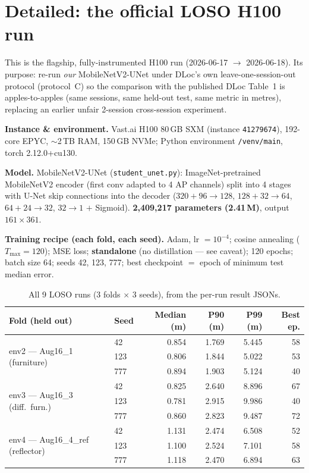 \documentclass[11pt]{article}
\newcommand{\file}[1]{\texttt{#1}}
\begin{document}
\section{Detailed: the official LOSO H100 run}
\label{sec:loso}
This is the flagship, fully-instrumented H100 run (2026-06-17 $\rightarrow$
2026-06-18). Its purpose: re-run \emph{our} MobileNetV2-UNet under DLoc's own
leave-one-session-out protocol (protocol~C) so the comparison with the published
DLoc Table~1 is apples-to-apples (same sessions, same held-out test, same metric
in metres), replacing an earlier unfair 2-session cross-session experiment.

\textbf{Instance \& environment.} Vast.ai H100 80\,GB SXM (instance
\texttt{41279674}), 192-core EPYC, $\sim$2\,TB RAM, 150\,GB NVMe; Python
environment \file{/venv/main}, torch 2.12.0+cu130.

\textbf{Model.} MobileNetV2-UNet (\file{student\_unet.py}): ImageNet-pretrained
MobileNetV2 encoder (first conv adapted to 4 AP channels) split into 4 stages
with U-Net skip connections into the decoder ($320{+}96{\to}128$,
$128{+}32{\to}64$, $64{+}24{\to}32$, $32{\to}1$ $+$ Sigmoid).
\textbf{2{,}409{,}217 parameters (2.41\,M)}, output $161\times361$.

\textbf{Training recipe (each fold, each seed).} Adam, lr $=10^{-4}$; cosine
annealing ($T_{\max}=120$); MSE loss; \textbf{standalone} (no distillation ---
see caveat); 120 epochs; batch size 64; seeds 42, 123, 777; best checkpoint $=$
epoch of minimum test median error.

\begin{table}[h]
\centering
\caption{All 9 LOSO runs (3 folds $\times$ 3 seeds), from the per-run result JSONs.}
\begin{tabular}{llrrrr}
\toprule
Fold (held out) & Seed & Median (m) & P90 (m) & P99 (m) & Best ep. \\
\midrule
\multirow{3}{*}{env2 --- Aug16\_1 (furniture)}
 & 42  & 0.854 & 1.769 & 5.445 & 58 \\
 & 123 & 0.806 & 1.844 & 5.022 & 53 \\
 & 777 & 0.894 & 1.903 & 5.124 & 40 \\
\midrule
\multirow{3}{*}{env3 --- Aug16\_3 (diff.\ furn.)}
 & 42  & 0.825 & 2.640 & 8.896 & 67 \\
 & 123 & 0.781 & 2.915 & 9.986 & 40 \\
 & 777 & 0.860 & 2.823 & 9.487 & 72 \\
\midrule
\multirow{3}{*}{env4 --- Aug16\_4\_ref (reflector)}
 & 42  & 1.131 & 2.474 & 6.508 & 52 \\
 & 123 & 1.100 & 2.524 & 7.101 & 58 \\
 & 777 & 1.118 & 2.470 & 6.894 & 63 \\
\bottomrule
\end{tabular}
\end{table}
\end{document}
